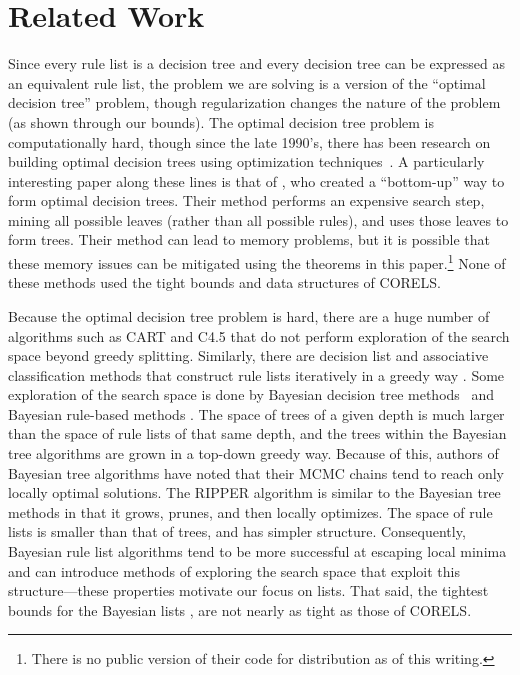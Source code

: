 \documentclass[twoside,11pt]{article}
\begin{document}
\section{Related Work}

Since every rule list is a decision tree and every decision tree can be expressed as an equivalent rule list, the problem we are solving is a version of the ``optimal decision tree'' problem, though regularization changes the nature of the problem (as shown through our bounds). The optimal decision tree problem is computationally hard, though since the late 1990's, there has been research on building optimal decision trees using optimization techniques~\citep{Bennett96optimaldecision,dobkininduction,FarhangfarGZ08}. A particularly interesting paper along these lines is that of \citet{NijssenFromont2010}, who created a ``bottom-up'' way to form optimal decision trees. Their method performs an expensive search step, mining all possible leaves (rather than all possible rules), and uses those leaves to form trees. Their method can lead to memory problems, but it is possible that these memory issues can be mitigated using the theorems in this paper.\footnote{There is no public version of their code for distribution as of this writing.} None of these methods used the tight bounds and data structures of CORELS.

Because the optimal decision tree problem is hard, there are a huge number of algorithms such as CART \citep{Breiman84} and C4.5 \citep{Quinlan93} that do not perform exploration of the search space beyond greedy splitting. Similarly, there are decision list and associative classification methods that construct rule lists iteratively in a greedy way
\citep{Rivest87,Liu98,Li01,Yin03,Sokolova03,Marchand05,Vanhoof10,RudinLeMa13}.
Some exploration of the search space is done by Bayesian decision tree methods~\citep{Dension:1998hl,Chipman:2002hc,Chipman10} and Bayesian rule-based methods \citep{LethamRuMcMa15,YangRuSe16}. The space of trees of a given depth is much larger than the space of
rule lists of that same depth, and the trees within the Bayesian tree algorithms
are grown in a top-down greedy way. Because of this, authors of Bayesian tree algorithms have noted that their MCMC chains tend to reach only locally optimal solutions.
The RIPPER algorithm \citep{ripper} is similar to the Bayesian tree methods in that it grows, prunes, and then locally optimizes.
%
The space of rule lists is smaller than that of trees, and has simpler structure.
%
Consequently, Bayesian rule list algorithms tend to be more successful at
escaping local minima and can introduce methods of exploring the search space
that exploit this structure---these properties motivate our focus on lists.
%
That said, the tightest bounds for the Bayesian lists \citep[namely, those of][upon whose work we build]{YangRuSe16},
are not nearly as tight as those of CORELS.
\end{document}
